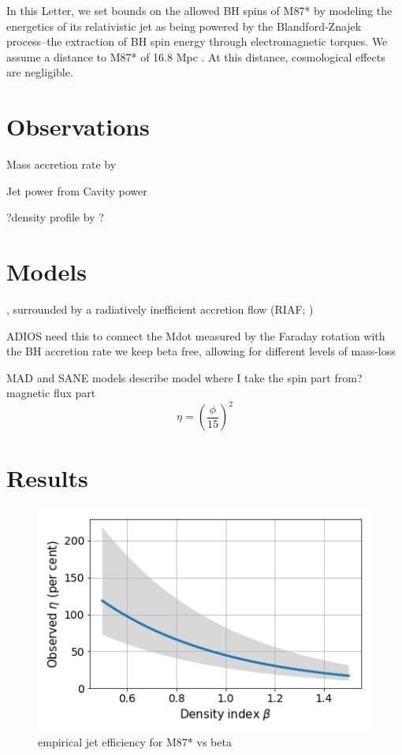 \documentclass[preprint2]{aastex62}
\begin{document}
In this Letter, we set bounds on the allowed BH spins of M87* by modeling the energetics of its relativistic jet as being powered by the Blandford-Znajek process--the extraction of BH spin energy through electromagnetic torques. We assume a distance to M87* of 16.8 Mpc . At this distance, cosmological effects are negligible. 



\section{Observations} \label{sec:obs}

Mass accretion rate by \cite{Kuo2014}

Jet power from Cavity power \cite{Russell2013}

?density profile by \cite{Russell2018}?


\section{Models}

, surrounded by a radiatively inefficient accretion flow (RIAF; \citealt{Ichimaru1977, Narayan1994, Yuan2014})

ADIOS \cite{Blandford1999}
need this to connect the Mdot measured by the Faraday rotation with the  BH accretion rate
we keep beta free, allowing for different levels of mass-loss

MAD and SANE models \cite{Narayan2003, Sasha2011, Narayan2012}
describe model
where I take the spin part from? \cite{Sasha2012a}
magnetic flux part
\begin{equation}
\eta = \left( \frac{\phi}{15} \right)^2 %
\end{equation}





\section{Results} 

\begin{figure}[h]
\centering
\includegraphics[width=\linewidth]{figures/observed-eta.png}
\caption{empirical jet efficiency for M87* vs beta}
\label{fig:obs-eta}
\end{figure}
\end{document}
